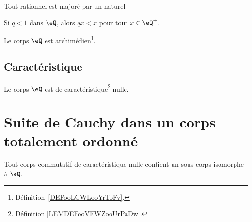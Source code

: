 \begin{lemma} \label{LEMooEBTIooGMoHsj}
    Tout rationnel est majoré par un naturel.
\end{lemma}


\begin{proposition}     \label{PROPooBTCCooVVvaeL}
    Si \( q<1\) dans \( \eQ\), alors \( qx<x\) pour tout \( x\in \eQ^+\).
\end{proposition}

\begin{proposition}     \label{PROPooMXGPooDUkOuv}
    Le corps \( \eQ\) est archimédien\footnote{Définition~\ref{DEFooLCWLooYrToFv}.}.
\end{proposition}

\subsection{Caractéristique}

\begin{lemma}       \label{LEMooYCPUooNxEPhB}
    Le corps \( \eQ\) est de caractéristique\footnote{Définition \ref{LEMDEFooVEWZooUrPaDw}.} nulle.
\end{lemma}

\section{Suite de Cauchy dans un corps totalement ordonné}


\begin{lemma}        \label{LEMooLTBIooSZnvsQ}
    Tout corps commutatif de caractéristique nulle contient un sous-corps isomorphe à \( \eQ\).
\end{lemma}

